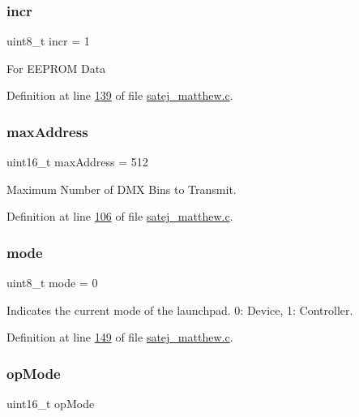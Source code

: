 \subsubsection{\texorpdfstring{incr}{incr}}
{\footnotesize\ttfamily uint8\+\_\+t incr = 1}

For E\+E\+P\+R\+OM Data 

Definition at line \mbox{\hyperlink{satej__matthew_8c_source_l00139}{139}} of file \mbox{\hyperlink{satej__matthew_8c_source}{satej\+\_\+matthew.\+c}}.

\mbox{\label{satej__matthew_8c_a00e6b200308fbb690bdc114e3ba5616b}} 
\subsubsection{\texorpdfstring{maxAddress}{maxAddress}}
{\footnotesize\ttfamily uint16\+\_\+t max\+Address = 512}

Maximum Number of D\+MX Bins to Transmit. 

Definition at line \mbox{\hyperlink{satej__matthew_8c_source_l00106}{106}} of file \mbox{\hyperlink{satej__matthew_8c_source}{satej\+\_\+matthew.\+c}}.

\mbox{\label{satej__matthew_8c_a37e90f5e3bd99fac2021fb3a326607d4}} 
\subsubsection{\texorpdfstring{mode}{mode}}
{\footnotesize\ttfamily uint8\+\_\+t mode = 0}

Indicates the current mode of the launchpad. 0\+: Device, 1\+: Controller. 

Definition at line \mbox{\hyperlink{satej__matthew_8c_source_l00149}{149}} of file \mbox{\hyperlink{satej__matthew_8c_source}{satej\+\_\+matthew.\+c}}.

\mbox{\label{satej__matthew_8c_a1aa9db2f061e57b247665a13005b6ea5}} 
\subsubsection{\texorpdfstring{opMode}{opMode}}
{\footnotesize\ttfamily uint16\+\_\+t op\+Mode}

